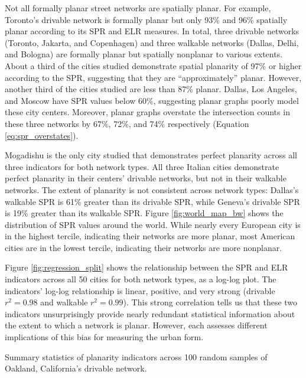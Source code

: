\documentclass[Afour,sageh,times]{sagej}
\begin{document}
Not all formally planar street networks are spatially planar. For example, Toronto's drivable network is formally planar but only 93\% and 96\% spatially planar according to its SPR and ELR measures. In total, three drivable networks (Toronto, Jakarta, and Copenhagen) and three walkable networks (Dallas, Delhi, and Bologna) are formally planar but spatially nonplanar to various extents. About a third of the cities studied demonstrate spatial planarity of 97\% or higher according to the SPR, suggesting that they are \enquote{approximately} planar. However, another third of the cities studied are less than 87\% planar. Dallas, Los Angeles, and Moscow have SPR values below 60\%, suggesting planar graphs poorly model these city centers. Moreover, planar graphs overstate the intersection counts in these three networks by 67\%, 72\%, and 74\% respectively (Equation \ref{eq:spr_overstates}).

Mogadishu is the only city studied that demonstrates perfect planarity across all three indicators for both network types. All three Italian cities demonstrate perfect planarity in their centers' drivable networks, but not in their walkable networks. The extent of planarity is not consistent across network types: Dallas's walkable SPR is 61\% greater than its drivable SPR, while Geneva's drivable SPR is 19\% greater than its walkable SPR. Figure \ref{fig:world_map_bw} shows the distribution of SPR values around the world. While nearly every European city is in the highest tercile, indicating their networks are more planar, most American cities are in the lowest tercile, indicating their networks are more nonplanar.

Figure \ref{fig:regression_split} shows the relationship between the SPR and ELR indicators across all 50 cities for both network types, as a log-log plot. The indicators' log-log relationship is linear, positive, and very strong (drivable $r^2=0.98$ and walkable $r^2=0.99$). This strong correlation tells us that these two indicators unsurprisingly provide nearly redundant statistical information about the extent to which a network is planar. However, each assesses different implications of this bias for measuring the urban form.

\begin{table}[htbp]
	\centering
	\caption{Summary statistics of planarity indicators across 100 random samples of Oakland, California's drivable network.}
	\label{tab:samples_city}
	
\end{table}
\end{document}
